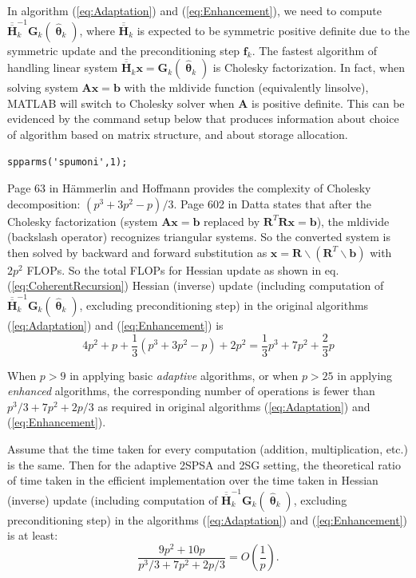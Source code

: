 \documentclass[conference,10.3cpt]{IEEEtran}
\newcommand{\bG}{\bm{G}}
\newcommand{\ooH}{\bm{\overline{\overline{H}}}}
\newcommand{\htheta}{\bm{\hat{\uptheta}}}
\begin{document}
In algorithm (\ref{eq:Adaptation}) and (\ref{eq:Enhancement}), we need to compute $\ooH_k^{-1} \bG_k(\htheta_k)$, where $\ooH_k$ is expected to be symmetric positive definite due to the symmetric update and the preconditioning step $\bm{f}_k$. The fastest algorithm of handling linear system $\ooH_k\bm{x}=\bG_k(\htheta_k)$ is Cholesky factorization. In fact, when solving system $\bm{Ax}=\bm{b}$ with the mldivide function (equivalently linsolve), MATLAB will switch to Cholesky solver when $\bm{A}$ is positive definite. This can be evidenced by the command setup below that produces information about choice of algorithm based on matrix structure, and about storage allocation.
\begin{verbatim} 
spparms('spumoni',1);
\end{verbatim}
 Page 63 in H{\"a}mmerlin and Hoffmann \cite{Hämmerlin2012} provides the complexity of Cholesky decomposition: $(p^3+3p^2-p)/3$. Page 602 in Datta \cite{Datta2008} states that after the Cholesky factorization (system $\bm{Ax}=\bm{b}$ replaced by $\bm{R}^T\bm{Rx}=\bm{b}$), the mldivide (backslash operator) recognizes triangular systems. So the converted system is then solved by backward and forward substitution as $\bm{x} = \bm{R} \backslash (\bm{R}^T \backslash \bm{b})$ with $2p^2$ FLOPs. So the total FLOPs for Hessian update as shown in eq. (\ref{eq:CoherentRecursion}) Hessian (inverse) update (including computation of $\ooH_k^{-1} \bG_k(\htheta_k)$, excluding preconditioning step) in the original algorithms (\ref{eq:Adaptation}) and (\ref{eq:Enhancement}) is
\begin{equation}
	4p^2+p+\frac{1}{3}(p^3+3p^2-p)+2p^2=\frac{1}{3}p^3+7p^2+\frac{2}{3}p
\end{equation}

When $p>9$ in applying basic \textit{adaptive} algorithms, or when $p>25$ in applying \textit{enhanced} algorithms, the corresponding number
of operations is fewer than $p^3/3+7p^2+2p/3$ as required in original algorithms (\ref{eq:Adaptation}) and (\ref{eq:Enhancement}).

Assume that the time taken for every computation (addition, multiplication, etc.) is the same. Then for the adaptive 2SPSA and 2SG setting, the theoretical ratio of time taken in the efficient implementation over the time taken in Hessian (inverse) update (including computation of $\ooH_k^{-1} \bG_k(\htheta_k)$, excluding preconditioning step) in the algorithms (\ref{eq:Adaptation}) and (\ref{eq:Enhancement}) is at least:
\begin{equation} \label{eq:ratio1}
\frac{9p^2+10p}{p^3/3+7p^2+2p/3} = O\left(\frac{1}{p}\right).
\end{equation}
\end{document}
